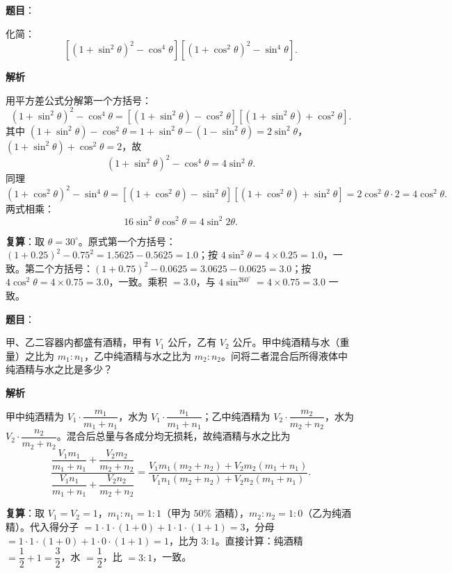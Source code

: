 \begin{answer}

\textbf{题目}：

化简：
\nopagebreak[4]
\[
\left[(1+\sin^2\theta)^2-\cos^4\theta\right]\left[(1+\cos^2\theta)^2-\sin^4\theta\right].
\]

\textbf{解析}

用平方差公式分解第一个方括号：
\nopagebreak[4]
\[
(1+\sin^2\theta)^2-\cos^4\theta
=\left[(1+\sin^2\theta)-\cos^2\theta\right]\left[(1+\sin^2\theta)+\cos^2\theta\right].
\]
其中 $(1+\sin^2\theta)-\cos^2\theta=1+\sin^2\theta-(1-\sin^2\theta)=2\sin^2\theta$，$(1+\sin^2\theta)+\cos^2\theta=2$，故
\nopagebreak[4]
\[
(1+\sin^2\theta)^2-\cos^4\theta=4\sin^2\theta.
\]
同理
\nopagebreak[4]
\[
(1+\cos^2\theta)^2-\sin^4\theta
=\left[(1+\cos^2\theta)-\sin^2\theta\right]\left[(1+\cos^2\theta)+\sin^2\theta\right]
=2\cos^2\theta\cdot2=4\cos^2\theta.
\]
两式相乘：
\nopagebreak[4]
\[
16\sin^2\theta\cos^2\theta=4\sin^2 2\theta.
\]

\textbf{复算}：取 $\theta=30^\circ$。原式第一个方括号：$(1+0.25)^2-0.75^2=1.5625-0.5625=1.0$；按 $4\sin^2\theta=4\times0.25=1.0$，一致。第二个方括号：$(1+0.75)^2-0.0625=3.0625-0.0625=3.0$；按 $4\cos^2\theta=4\times0.75=3.0$，一致。乘积 $=3.0$，与 $4\sin^260^\circ=4\times0.75=3.0$ 一致。


\end{answer}
\begin{answer}

\textbf{题目}：

甲、乙二容器内都盛有酒精，甲有 $V_1$ 公斤，乙有 $V_2$ 公斤。甲中纯酒精与水（重量）之比为 $m_1:n_1$，乙中纯酒精与水之比为 $m_2:n_2$。问将二者混合后所得液体中纯酒精与水之比是多少？

\textbf{解析}

甲中纯酒精为 $V_1\cdot\dfrac{m_1}{m_1+n_1}$，水为 $V_1\cdot\dfrac{n_1}{m_1+n_1}$；乙中纯酒精为 $V_2\cdot\dfrac{m_2}{m_2+n_2}$，水为 $V_2\cdot\dfrac{n_2}{m_2+n_2}$。混合后总量与各成分均无损耗，故纯酒精与水之比为
\nopagebreak[4]
\[
\frac{\dfrac{V_1m_1}{m_1+n_1}+\dfrac{V_2m_2}{m_2+n_2}}{\dfrac{V_1n_1}{m_1+n_1}+\dfrac{V_2n_2}{m_2+n_2}}
=\frac{V_1m_1(m_2+n_2)+V_2m_2(m_1+n_1)}{V_1n_1(m_2+n_2)+V_2n_2(m_1+n_1)}.
\]

\textbf{复算}：取 $V_1=V_2=1$，$m_1:n_1=1:1$（甲为 $50\%$ 酒精），$m_2:n_2=1:0$（乙为纯酒精）。代入得分子 $=1\cdot1\cdot(1+0)+1\cdot1\cdot(1+1)=3$，分母 $=1\cdot1\cdot(1+0)+1\cdot0\cdot(1+1)=1$，比为 $3:1$。直接计算：纯酒精 $=\dfrac12+1=\dfrac32$，水 $=\dfrac12$，比 $=3:1$，一致。


\end{answer}
